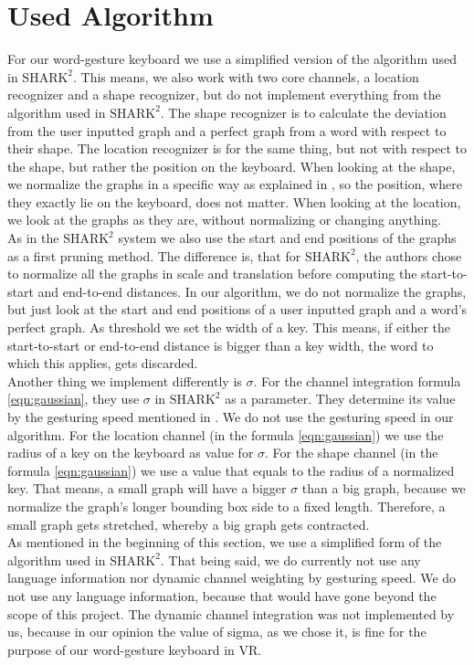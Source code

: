 \section{Used Algorithm}
For our word-gesture keyboard we use a simplified version of the algorithm used in $\text{SHARK}^2$. This means, we also work with two core channels, a location recognizer and a shape recognizer, but do not implement everything from the algorithm used in $\text{SHARK}^2$. The shape recognizer is to calculate the deviation from the user inputted graph and a perfect graph from a word with respect to their shape. The location recognizer is for the same thing, but not with respect to the shape, but rather the position on the keyboard. When looking at the shape, we normalize the graphs in a specific way as explained in , so the position, where they exactly lie on the keyboard, does not matter. When looking at the location, we look at the graphs as they are, without normalizing or changing anything.\\
As in the $\text{SHARK}^2$ system we also use the start and end positions of the graphs as a first pruning method. The difference is, that for $\text{SHARK}^2$, the authors chose to normalize all the graphs in scale and translation before computing the start-to-start and end-to-end distances. In our algorithm, we do not normalize the graphs, but just look at the start and end positions of a user inputted graph and a word's perfect graph. As threshold we set the width of a key. This means, if either the start-to-start or end-to-end distance is bigger than a key width, the word to which this applies, gets discarded.\\
Another thing we implement differently is $\sigma$. For the channel integration formula \ref{eqn:gaussian}, they use $\sigma$ in $\text{SHARK}^2$ as a parameter. They determine its value by the gesturing speed mentioned in . We do not use the gesturing speed in our algorithm. For the location channel (in the formula \ref{eqn:gaussian}) we use the radius of a key on the keyboard as value for $\sigma$. For the shape channel (in the formula \ref{eqn:gaussian}) we use a value that equals to the radius of a normalized key. That means, a small graph will have a bigger $\sigma$ than a big graph, because we normalize the graph's longer bounding box side to a fixed length. Therefore, a small graph gets stretched, whereby a big graph gets contracted.\\
As mentioned in the beginning of this section, we use a simplified form of the algorithm used in $\text{SHARK}^2$. That being said, we do currently not use any language information nor dynamic channel weighting by gesturing speed. We do not use any language information, because that would have gone beyond the scope of this project. The dynamic channel integration was not implemented by us, because in our opinion the value of sigma, as we chose it, is fine for the purpose of our word-gesture keyboard in VR.

